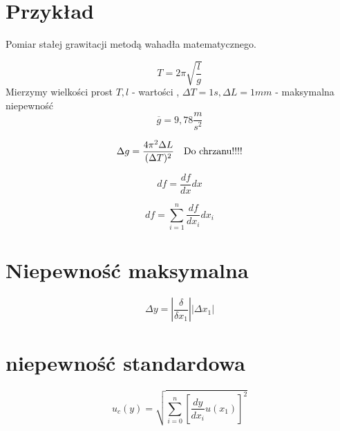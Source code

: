 \documentclass[11pt]{article}
\begin{document}
\section{Przykład}
Pomiar stałej grawitacji metodą wahadła matematycznego.

$$ T = 2 \pi \sqrt{\frac{l}{g}} $$
Mierzymy wielkości prost $ T, l $ - wartości , $ \Delta T = 1s, \Delta L = 1mm$ - maksymalna niepewność 
$$ \overline{g} = 9,78 \frac{m}{s^2} $$

$$ \Delta g = \frac{4\pi^2 \Delta L}{(\Delta T)^2} \quad \hbox{Do chrzanu!!!!}$$

$$ df = \frac{df}{dx}dx $$

$$ df = \sum_{i=1}^n \frac{df}{dx_i}dx_i $$

\section{Niepewność maksymalna}

$$ \Delta y = \left|\frac{\delta}{\delta x_1}\right| |\Delta x_1| $$

\section{niepewność standardowa}
$$ u_c(y) = \sqrt{ \sum_{i=0}^{n} \left[ \frac{dy}{dx_i} u(x_1) \right]^2} $$
\end{document}
